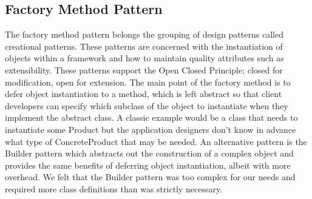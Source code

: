 \documentclass[11pt]{report}
\begin{document}
	\subsection{Factory Method Pattern}
	The factory method pattern belongs the grouping of design patterns called creational patterns. These patterns are concerned with the instantiation of objects within a framework and how to maintain quality attributes such as extensibility. These patterns support the Open Closed Principle; closed for modification, open for extension. The main point of the factory method is to defer object instantiation to a method, which is left abstract so that client developers can specify which subclass of the object to instantiate when they implement the abstract class. A classic example would be a class that needs to instantiate some Product but the application designers don’t know in advance what type of ConcreteProduct that may be needed. An alternative pattern is the Builder pattern which abstracts out the construction of a complex object and provides the same benefits of deferring object instantiation, albeit with more overhead. We felt that the Builder pattern was too complex for our needs and required more class definitions than was strictly necessary. 
	
\end{document}
